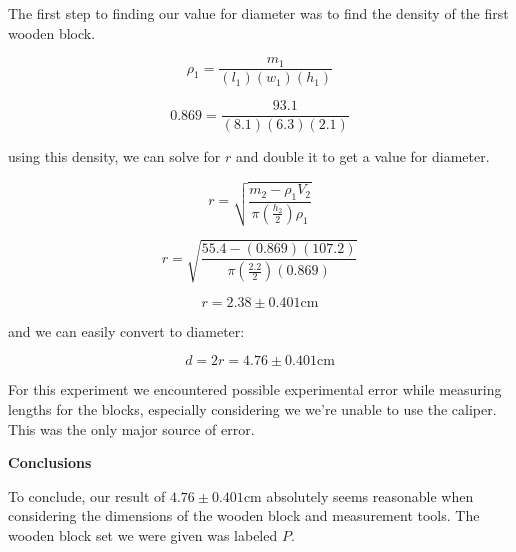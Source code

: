 \documentclass[12pt]{article}
\begin{document}
\vspace{1em}

The first step to finding our value for diameter was to find the
density of the first wooden block.

\[ \rho_1 = \frac{ m_1 } { (l_1) (w_1) (h_1) } \]

\[ 0.869 = \frac{ 93.1 } { (8.1) (6.3) (2.1) } \]

using this density, we can solve for $r$ and double it to get a value for diameter.

\[ r = \sqrt{ \frac{m_2 - \rho_1 V_2}{\pi ( \frac{h_2}{2} ) \rho_1} } \]

\[ r = \sqrt{ \frac{55.4 - (0.869) (107.2)}{\pi ( \frac{2.2}{2} ) (0.869)} } \]

\[ r = 2.38 \pm 0.401 \text{cm} \]

and we can easily convert to diameter:

\[ d = 2r = 4.76 \pm 0.401 \text{cm}\]

For this experiment we encountered possible experimental error while measuring
lengths for the blocks, especially considering we we're unable to use the
caliper. This was the only major source of error.

\vspace{1em}

\textbf{Conclusions}\vspace{1em}

To conclude, our result of $4.76 \pm 0.401 \text{cm}$ absolutely seems reasonable when considering
the dimensions of the wooden block and measurement tools. The wooden block set we were given was labeled $P$.
\end{document}
